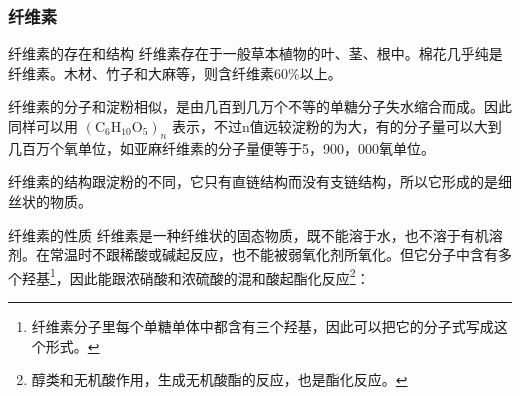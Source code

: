 \begin{figure}
{%
}


\end{figure}

\subsubsection{纤维素}

纤维素的存在和结构
纤维素存在于一般草本植物的叶、茎、根中。棉花几乎纯是纤维素。木材、竹子和大麻等，则含纤维素60\%以上。

纤维素的分子和淀粉相似，是由几百到几万个不等的单糖分子失水缩合而成。因此同样可以用
\(\left(\mathrm{C}_{6}\mathrm{H}_{10}\mathrm{O}_{5}\right)_{n}\)
表示，不过n值远较淀粉的为大，有的分子量可以大到几百万个氧单位，如亚麻纤维素的分子量便等于5，900，000氧单位。

纤维素的结构跟淀粉的不同，它只有直链结构而没有支链结构，所以它形成的是细丝状的物质。

纤维素的性质
纤维素是一种纤维状的固态物质，既不能溶于水，也不溶于有机溶剂。在常温时不跟稀酸或碱起反应，也不能被弱氧化剂所氧化。但它分子中含有多个羟基\footnote{纤维素分子里每个单糖单体中都含有三个羟基，因此可以把它的分子式写成这个形式。}，因此能跟浓硝酸和浓硫酸的混和酸起酯化反应\footnote{醇类和无机酸作用，生成无机酸酯的反应，也是酯化反应。}：

